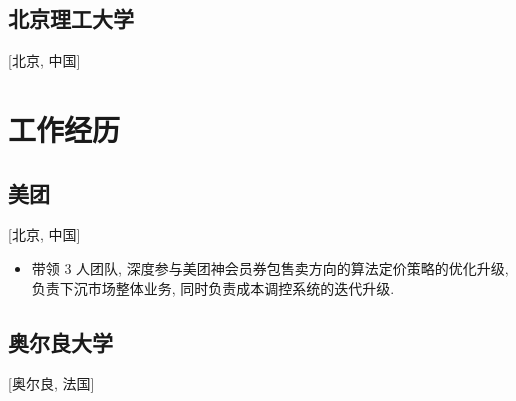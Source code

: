 \documentclass{mycv}
\begin{document}
\begin{positions}
\end{positions}

\vspace{-\parskip}

\subsection{\large 北京理工大学}[北京, 中国]

\vspace{0.3em}

\begin{positions}
\end{positions}

\vspace{-1em}

\section{工作经历}

\subsection{\large 美团}[北京, 中国]

\vspace{0.3em}

\begin{positions}
\end{positions}

\begin{itemize}
  \item 带领 3 人团队, 深度参与美团神会员券包售卖方向的算法定价策略的优化升级, 负责下沉市场整体业务, 同时负责成本调控系统的迭代升级.
\end{itemize}

\vspace{-0.5em}

\subsection{\large 奥尔良大学}[奥尔良, 法国]

\vspace{0.3em}
\end{document}
